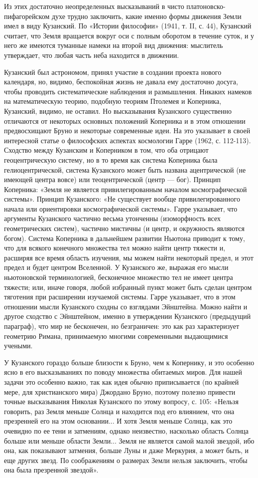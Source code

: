 Из этих достаточно неопределенных высказываний в чисто
платоновско-пифагорейском духе трудно заключить, какие именно формы
движения Земли имел в виду Кузанский. По «Истории философии» (1941, т.
II, с. 44), Кузанский считает, что Земля вращается вокруг оси с полным
оборотом в течение суток, и у него же имеются туманные намеки на
второй вид движения: мыслитель утверждает, что любая часть неба
находится в движении.

Кузанский был астрономом, принял участие в создании проекта нового
календаря, но, видимо, беспокойная жизнь не давала ему достаточно
досуга, чтобы проводить систематические наблюдения и размышления.
Никаких намеков на математическую теорию, подобную теориям Птолемея и
Коперника, Кузанский, видимо, не оставил. Но высказывания Кузанского
существенно отличаются от некоторых основных положений Коперника и в
этом отношении предвосхищают Бруно и некоторые современные идеи. На
это указывает в своей интересной статье о философских аспектах
космологии Гарре (1962, с. 112-113). Сходство между Кузанским и
Коперником в том, что оба отрицают геоцентрическую систему, но в то
время как система Коперника была гелиоцентрической, система Кузанского
может быть названа ацентрической (не имеющей центра вовсе) или
теоцентрической (центр --- бог). Принцип Коперника: «Земля не является
привилегированным началом космографической системы». Принцип
Кузанского: «Не существует вообще привилегированного начала или
ориентировки космографической системы». Гарре указывает, что аргументы
Кузанского частично весьма утонченны (изоморфность всех геометрических
систем), частично мистичны (и центр, и окружность являются богом).
Система Коперника в дальнейшем развитии Ньютона приводит к тому, что
для всякого конечного множества тел можно найти центр тяжести и,
расширяя все время область изучения, мы можем найти некоторый предел,
и этот предел и будет центром Вселенной. У Кузанского же, выражая его
мысли ньютоновской терминологией, бесконечное множество тел не имеет
центра тяжести; или, иначе говоря, любой избранный пункт может быть
сделан центром тяготения при расширении изучаемой системы. Гарре
указывает, что в этом отношении мысли Кузанского сходны со взглядами
Эйнштейна. Можно найти и другое сходство с Эйнштейном, именно в
утверждении Кузанского (предыдущий параграф), что мир не бесконечен,
но безграничен: это как раз характеризует геометрию Римана,
принимаемую многими современными выдающимися учеными.

У Кузанского гораздо больше близости к Бруно, чем к Копернику, и это
особенно ясно в его высказываниях по поводу множества обитаемых миров.
Для нашей задачи это особенно важно, так как идея обычно приписывается
(по крайней мере, для христианского мира) Джордано Бруно, поэтому
полезно привести точные высказывания Николая Кузанского по этому
вопросу, с. 105: «Нельзя говорить, раз Земля меньше Солнца и находится
под его влиянием, что она презренней его на этом основании... И хотя
Земля меньше Солнца, как это очевидно по ее тени и затмениям, однако
неизвестно, насколько область Солнца больше или меньше области
Земли... Земля не является самой малой звездой, ибо она, как
показывают затмения, больше Луны и даже Меркурия, а может быть, и еще
других звезд. По соображениям о размерах Земли нельзя заключить, чтобы
она была презренной звездой».

